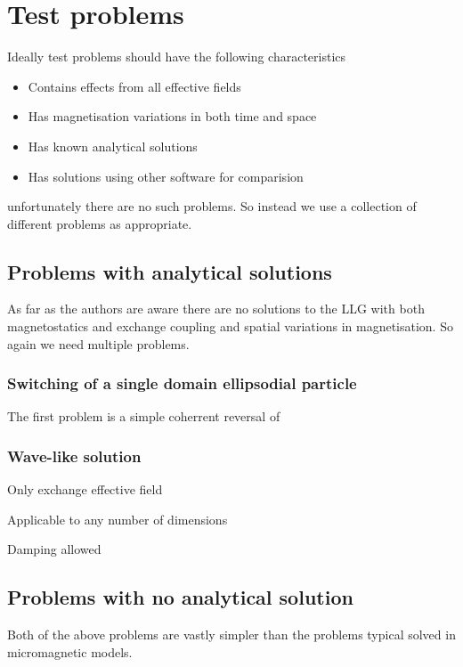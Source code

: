 \chapter{Test problems}
\label{sec:test-problems}


Ideally test problems should have the following characteristics

\begin{itemize}
\item Contains effects from all effective fields
\item Has magnetisation variations in both time and space
\item Has known analytical solutions
\item Has solutions using other software for comparision
\end{itemize}

unfortunately there are no such problems. 
So instead we use a collection of different problems as appropriate.

\section{Problems with analytical solutions}

As far as the authors are aware there are no solutions to the LLG with both magnetostatics and exchange coupling and spatial variations in magnetisation. 
So again we need multiple problems.

\subsection{Switching of a single domain ellipsodial particle}

The first problem is a simple coherrent reversal of 


\subsection{Wave-like solution}

Only exchange effective field

Applicable to any number of dimensions

Damping allowed


\section{Problems with no analytical solution}

Both of the above problems are vastly simpler than the problems typical solved in micromagnetic models.

